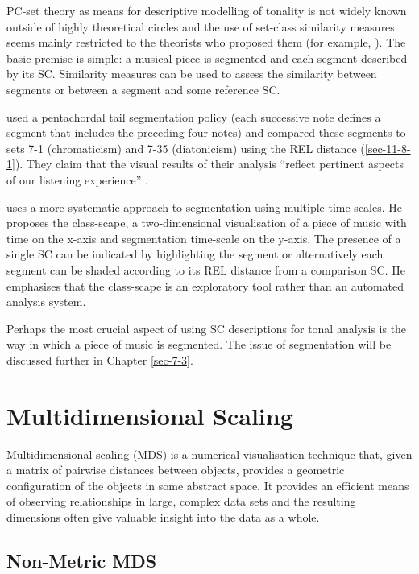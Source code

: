 \documentclass{article}
\begin{document}
PC-set theory as means for descriptive modelling of tonality is not
widely known outside of highly theoretical circles and the use of
set-class similarity measures seems mainly restricted to the theorists
who proposed them (for example, \citealt{Isaacson1996}). The basic
premise is simple: a musical piece is segmented and each segment
described by its SC. Similarity measures can be used to assess the
similarity between segments or between a segment and some reference
SC.

\citet{Huovinen2007} used a pentachordal tail segmentation policy
(each successive note defines a segment that includes the preceding
four notes) and compared these segments to sets 7-1 (chromaticism) and
7-35 (diatonicism) using the REL distance (\ref{sec-11-8-1}). They claim that the
visual results of their analysis ``reflect pertinent aspects of our
listening experience'' \citep[pp. 204]{Huovinen2007}.

\citet[chap. 5.3]{Martorell2013} uses a more systematic approach to
segmentation using multiple time scales. He proposes the class-scape,
a two-dimensional visualisation of a piece of music with time on the
x-axis and segmentation time-scale on the y-axis. The presence of a
single SC can be indicated by highlighting the segment or
alternatively each segment can be shaded according to its REL distance
from a comparison SC. He emphasises that the class-scape is an
exploratory tool rather than an automated analysis system.

Perhaps the most crucial aspect of using SC descriptions for tonal
analysis is the way in which a piece of music is segmented. The issue
of segmentation will be discussed further in Chapter \ref{sec-7-3}.

\section{Multidimensional Scaling}
\label{sec-4}

Multidimensional scaling (MDS) is a numerical visualisation technique
that, given a matrix of pairwise distances between objects, provides a
geometric configuration of the objects in some abstract space. It
provides an efficient means of observing relationships in large,
complex data sets and the resulting dimensions often give valuable
insight into the data as a whole.
\subsection{Non-Metric MDS}
\label{sec-4-1}
\end{document}
